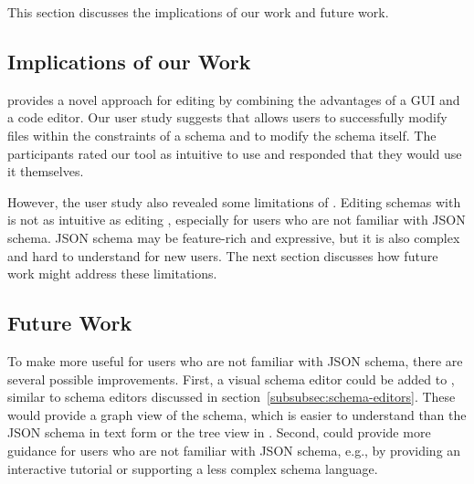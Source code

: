 This section discusses the implications of our work and future work.


\subsection{Implications of our Work}\label{subsec:implications-of-our-work}

\toolname{} provides a novel approach for editing \cfgfiles{}
by combining the advantages of a GUI and a code editor.
Our user study suggests that \toolname{} allows users to successfully modify files within the constraints of a schema and to modify the schema itself.
The participants rated our tool as intuitive to use and responded that they would use it themselves.

However, the user study also revealed some limitations of \toolname{}.
Editing schemas with \toolname{} is not as intuitive as editing \cfgfiles{},
especially for users who are not familiar with JSON schema.
JSON schema may be feature-rich and expressive, but it is also complex and
hard to understand for new users.
The next section discusses how future work might address these limitations.

\subsection{Future Work}\label{subsec:future-work}
To make \toolname{} more useful for users who are not familiar with JSON schema,
there are several possible improvements.
First, a visual schema editor could be added to \toolname{}, similar to schema editors
discussed in section~\ref{subsubsec:schema-editors}.
These would provide a graph view of the schema, which is easier to understand than
the JSON schema in text form or the tree view in \toolname{}.
Second, \toolname{} could provide more guidance for users who are not familiar with JSON schema,
e.g., by providing an interactive tutorial or supporting a less complex schema language.

